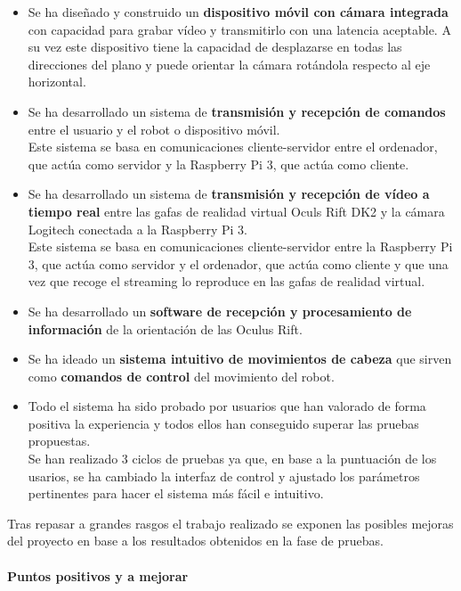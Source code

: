 \documentclass[twoside, 11pt]{epstfg}
\begin{document}
\begin{itemize}
	\item Se ha diseñado y construido un \textbf{dispositivo móvil con cámara integrada} con capacidad para grabar vídeo y transmitirlo con una latencia aceptable. A su vez este dispositivo tiene la capacidad de desplazarse en todas las direcciones del plano y puede orientar la cámara rotándola respecto al eje horizontal.
	\item Se ha desarrollado un sistema de \textbf{transmisión y recepción de comandos} entre el usuario y el robot o dispositivo móvil.\\Este sistema se basa en comunicaciones cliente-servidor entre el ordenador, que actúa como servidor y la Raspberry Pi 3, que actúa como cliente.
	\item Se ha desarrollado un sistema de \textbf{transmisión y recepción de vídeo a tiempo real} entre las gafas de realidad virtual Oculs Rift DK2 y la cámara Logitech conectada a la Raspberry Pi 3.\\Este sistema se basa en comunicaciones cliente-servidor entre la Raspberry Pi 3, que actúa como servidor y el ordenador, que actúa como cliente y que una vez que recoge el streaming lo reproduce en las gafas de realidad virtual.
	\item Se ha desarrollado un \textbf{software de recepción y procesamiento de información} de la orientación de las Oculus Rift.
	\item Se ha ideado un \textbf{sistema intuitivo de movimientos de cabeza} que sirven como \textbf{comandos de control} del movimiento del robot.
	\item Todo el sistema ha sido probado por usuarios que han valorado de forma positiva la experiencia y todos ellos han conseguido superar las pruebas propuestas.\\ Se han realizado 3 ciclos de pruebas ya que, en base a la puntuación de los usarios, se ha cambiado la interfaz de control y ajustado los parámetros pertinentes para hacer el sistema más fácil e intuitivo.
\end{itemize}

Tras repasar a grandes rasgos el trabajo realizado se exponen las posibles mejoras del proyecto en base a los resultados obtenidos en la fase de pruebas.

\paragraph{Puntos positivos y a mejorar}
\end{document}
